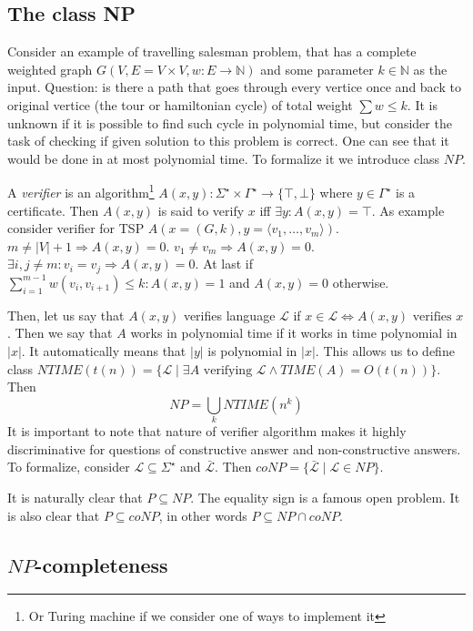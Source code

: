 \documentclass[12pt]{article}
\begin{document}
\subsection{The class NP}
Consider an example of travelling salesman problem, that has a complete weighted graph \(G(V,E=V\times V,w\colon E\to\mathbb N)\) and some parameter \(k\in\mathbb N\) as the input. Question: is there a path that goes through every vertice once and back to original vertice (the tour or hamiltonian cycle) of total weight \(\sum w \leq k\). It is unknown if it is possible to find such cycle in polynomial time, but consider the task of checking if given solution to this problem is correct. One can see that it would be done in at most polynomial time. To formalize it we introduce class \(NP\).

A \emph{verifier} is an algorithm\footnote{Or Turing machine if we consider one of ways to implement it} \(A(x,y)\colon \Sigma^{\star}\times \Gamma^{\star}\to \{\top,\bot\}\) where \(y\in \Gamma^{\star}\) is a certificate. Then \(A(x,y)\) is said to verify \(x\) iff \(\exists y\colon A(x,y)=\top \).
As example consider verifier for TSP \(A(x=(G,k),y=\langle v_1,\ldots, v_m\rangle)\). \(m\neq |V|+1\Rightarrow A(x,y)=0\). \(v_1\neq v_m \Rightarrow A(x,y)=0\).  \(\exists i,j\neq m\colon v_i=v_j\Rightarrow A(x,y)=0\). At last if \(\sum_{i=1}^{m-1} w(v_i,v_{i+1})\leq k\colon A(x,y)=1\) and \(A(x,y)=0\) otherwise.

Then, let us say that \(A(x,y)\) verifies language \(\mathcal L\) if \(x\in\mathcal L \Leftrightarrow A(x,y)\text{ verifies } x\). Then we say that \(A\) works in polynomial time if it works in time polynomial in \(|x|\). It automatically means that \(|y|\) is polynomial in \(|x|\). This allows us to define class \(NTIME(t(n))=\{\mathcal L\mid \exists A \text{ verifying } \mathcal L\land TIME(A)=O(t(n))\}\). Then
\begin{equation}
  \label{eq:npdef}
  NP=\bigcup_k NTIME(n^k)
\end{equation}
It is important to note that nature of verifier algorithm makes it highly discriminative for questions of constructive answer and non-constructive answers. To formalize, consider \(\mathcal L\subseteq \Sigma^{\star}\) and \(\mathcal {\bar L}\). Then \(coNP = \{\mathcal {\bar L} \mid \mathcal L\in NP\}\).

It is naturally clear that \(P\subseteq NP\). The equality sign is a famous open problem. It is also clear that \(P\subseteq coNP\), in other words \(P\subseteq NP\cap coNP\).
\subsection{\(NP\)-completeness}
\end{document}
